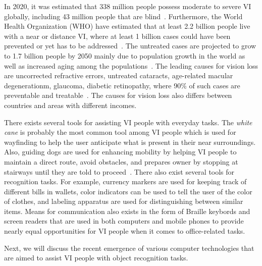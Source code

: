 In 2020, it was estimated that 338 million people possess moderate to severe VI globally, including 43 million people that are blind~\cite{bourne2021trends}. 
Furthermore, the World Health Organization (WHO) have estimated that at least 2.2 billion people live with a near or distance VI, where at least 1 billion cases could have been prevented or yet has to be addressed~\cite{who2019world}. The untreated cases are projected to grow to 1.7 billion people by 2050 mainly due to population growth in the world as well as increased aging among the populations~\cite{bourne2021trends}. 
The leading causes for vision loss are uncorrected refractive errors, untreated cataracts, age-related macular degenerationm, glaucoma, diabetic retinopathy, where 90\% of such cases are preventable and treatable~\cite{steinmetz2021causes}. The causes for vision loss also differs between countries and areas with different incomes.  

There exists several tools for assisting VI people with everyday tasks. The \textit{white cane} is probably the most common tool among VI people which is used for wayfinding to help the user anticipate what is present in their near surroundings. Also, guiding dogs are used for enhancing mobility by helping VI people to maintain a direct route, avoid obstacles, and prepares owner by stopping at %
stairways until they are told to proceed~\cite{manduchi2012computer}. There also exist several tools for recognition tasks. For example, currency markers are used for keeping track of different bills in wallets, color indicators can be used to tell the user of the color of clothes, and labeling apparatus are used for distinguishing between similar items. Means for communication also exists in the form of Braille keybords and screen readers that are used in both computers and mobile phones to provide nearly equal opportunities for VI people when it comes to office-related tasks. %

Next, we will discuss the recent emergence of various computer technologies that are aimed to assist VI people with object recognition tasks.  




